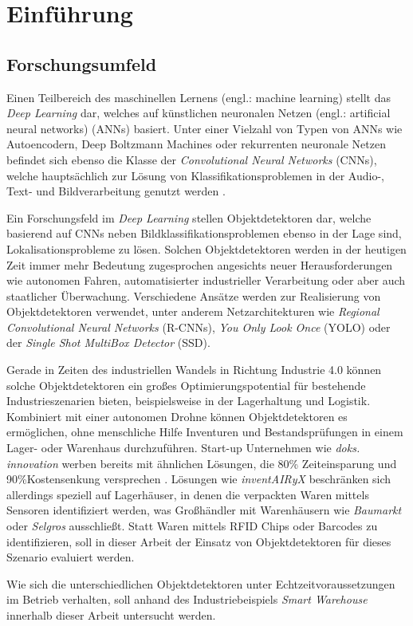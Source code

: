 \chapter{Einführung}

\section{Forschungsumfeld}

Einen Teilbereich des maschinellen Lernens (engl.: machine learning) stellt das \textit{Deep Learning} dar, welches auf künstlichen neuronalen Netzen (engl.: artificial neural networks) (ANNs) basiert. Unter einer Vielzahl von Typen von ANNs wie Autoencodern, Deep Boltzmann Machines oder rekurrenten neuronale Netzen befindet sich ebenso die Klasse der \textit{Convolutional Neural Networks} (CNNs), welche hauptsächlich zur Lösung von Klassifikationsproblemen in der Audio-, Text- und Bildverarbeitung genutzt werden \cite{AurelienGeron.2018,TaoWangDavidJ.WuAdamCoatesAndrewY.Ng.2012}.

Ein Forschungsfeld im \textit{Deep Learning} stellen Objektdetektoren dar, welche basierend auf CNNs neben Bildklassifikationsproblemen ebenso in der Lage sind, Lokalisationsprobleme zu lösen. Solchen Objektdetektoren werden in der heutigen Zeit immer mehr Bedeutung zugesprochen angesichts neuer Herausforderungen wie autonomen Fahren, automatisierter industrieller Verarbeitung oder aber auch staatlicher Überwachung. Verschiedene Ansätze werden zur Realisierung von Objektdetektoren verwendet, unter anderem Netzarchitekturen wie \textit{Regional Convolutional Neural Networks} (R-CNNs), \textit{You Only Look Once} (YOLO) oder der \textit{Single Shot MultiBox Detector} (SSD). 

Gerade in Zeiten des industriellen Wandels in Richtung Industrie 4.0 können solche Objektdetektoren ein großes Optimierungspotential für bestehende Industrieszenarien bieten, beispielsweise in der Lagerhaltung und Logistik. Kombiniert mit einer autonomen Drohne können Objektdetektoren es ermöglichen, ohne menschliche Hilfe Inventuren und Bestandsprüfungen in einem Lager- oder Warenhaus durchzuführen. Start-up Unternehmen wie \textit{doks. innovation} werben bereits mit ähnlichen Lösungen, die 80\% Zeiteinsparung und 90\%Kostensenkung versprechen \cite{doks.innovation.2019}. Lösungen wie \textit{inventAIRyX} beschränken sich allerdings speziell auf Lagerhäuser, in denen die verpackten Waren mittels Sensoren identifiziert werden, was Großhändler mit Warenhäusern wie \textit{Baumarkt} oder \textit{Selgros} ausschließt. Statt Waren mittels RFID Chips oder Barcodes zu identifizieren, soll in dieser Arbeit der Einsatz von Objektdetektoren für dieses Szenario evaluiert werden.

Wie sich die unterschiedlichen Objektdetektoren unter Echtzeitvoraussetzungen im Betrieb verhalten, soll anhand des Industriebeispiels \textit{Smart Warehouse} innerhalb dieser Arbeit untersucht werden. 

